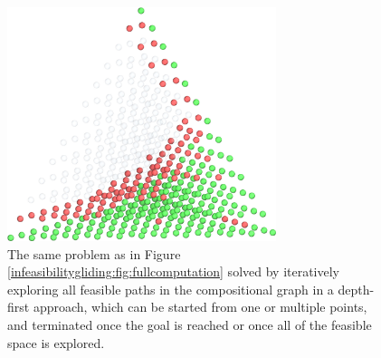 \begin{figure}[H]
    \centering
    \includegraphics[width=0.7\textwidth]{infeasibilitygliding/InfeasibilityGliding_Glide.jpeg}
    \caption{The same problem as in Figure \ref{infeasibilitygliding:fig:fullcomputation} solved by iteratively exploring all feasible paths in the compositional graph in a depth-first approach, which can be started from one or multiple points, and terminated once the goal is reached or once all of the feasible space is explored.}
    \label{infeasibilitygliding:fig:glide}
\end{figure}


\printbibliography[heading=subbibintoc]